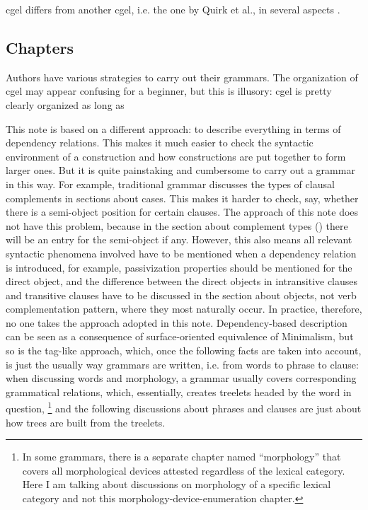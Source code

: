 \documentclass{article}
\begin{document}
\ac{cgel} differs from another \ac{cgel}, i.e. the one by Quirk et al., in several aspects \citep{leech2004}.

\subsection{Chapters}

Authors have various strategies to carry out their grammars.
The organization of \ac{cgel} may appear confusing for a beginner,
but this is illusory:
\ac{cgel} is pretty clearly organized as long as 

This note is based on a different approach:
to describe everything in terms of dependency relations.
This makes it much easier to check the syntactic environment of a construction 
and how constructions are put together to form larger ones.
But it is quite painstaking and cumbersome to carry out a grammar in this way.
For example, traditional grammar discusses 
the types of clausal complements in sections about cases.
This makes it harder to check, say, whether there is a semi-object position for certain clauses.
The approach of this note does not have this problem, 
because in the section about complement types ()
there will be an entry for the semi-object if any.
However, this also means all relevant syntactic phenomena involved 
have to be mentioned when a dependency relation is introduced,
for example, passivization properties should be mentioned for the direct object,
and the difference between the direct objects in intransitive clauses and transitive clauses 
have to be discussed in the section about objects,
not verb complementation pattern, where they most naturally occur.
In practice, therefore, no one takes the approach adopted in this note.
Dependency-based description can be seen as a consequence of surface-oriented equivalence of Minimalism,
but so is the \ac{tag}-like approach,
which, once the following facts are taken into account, is just the usually way grammars are written,
i.e. from words to phrase to clause:
when discussing words and morphology, a grammar usually covers corresponding grammatical relations,
which, essentially, creates treelets headed by the word in question,%
\footnote{
    In some grammars, there is a separate chapter named ``morphology''
    that covers all morphological devices attested
    regardless of the lexical category.
    Here I am talking about discussions on morphology of a specific lexical category 
    and not this morphology-device-enumeration chapter.
}
and the following discussions about phrases and clauses are just about how trees are built from the treelets.
\end{document}
